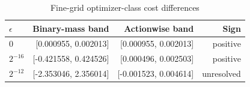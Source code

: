 \begin{table}[htbp]\centering
\caption{Fine-grid optimizer-class cost differences}\label{tab:fine-classes82}
{\small\setlength{\tabcolsep}{4pt}\begin{tabular}{lrrr}
\hline
$\epsilon$ & Binary-mass band & Actionwise band & Sign \\
\hline
$0$ & [0.000955, 0.002013] & [0.000955, 0.002013] & positive \\
$2^{-16}$ & [-0.421558, 0.424526] & [0.000496, 0.002503] & positive \\
$2^{-12}$ & [-2.353046, 2.356014] & [-0.001523, 0.004614] & unresolved \\
\hline\end{tabular}}
\par{}
\end{table}
